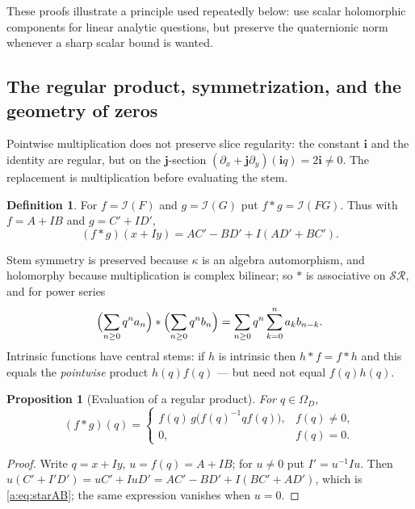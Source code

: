 \documentclass[11pt,a4paper]{article}
\numberwithin{equation}{section}
\newtheorem{proposition}[theorem]{Proposition}
\theoremstyle{definition}
\newtheorem{definition}[theorem]{Definition}
\theoremstyle{remark}
\theoremstyle{plain}
\newcommand{\I}{\mathcal I}
\newcommand{\SR}{\mathcal{SR}}
\newcommand{\Om}{\Omega}
\begin{document}
These proofs illustrate a principle used repeatedly below: use scalar
holomorphic components for linear analytic questions, but preserve the
quaternionic norm whenever a sharp scalar bound is wanted.

\subsection{The regular product, symmetrization, and the geometry of zeros}
\label{a:sec:algebra}

Pointwise multiplication does not preserve slice regularity: the constant
$\mathbf i$ and the identity are regular, but on the $\mathbf j$-section
$(\partial_x+\mathbf j\partial_y)(\mathbf iq)=2\mathbf i\ne0$. The replacement
is multiplication before evaluating the stem.

\begin{definition}
\label{a:def:star}
For $f=\I(F)$ and $g=\I(G)$ put $f*g=\I(FG)$. Thus with $f=A+IB$ and
$g=C'+ID'$,
\begin{equation}
 (f*g)(x+Iy)=AC'-BD'+I(AD'+BC').
 \label{a:eq:starAB}
\end{equation}
\end{definition}

Stem symmetry is preserved because $\kappa$ is an algebra automorphism, and
holomorphy because multiplication is complex bilinear; so $*$ is associative
on $\SR$, and for power series
\begin{equation}
 \Bigl(\sum_{n\ge0}q^na_n\Bigr)*\Bigl(\sum_{n\ge0}q^nb_n\Bigr)
 =\sum_{n\ge0}q^n\sum_{k=0}^na_kb_{n-k}.
 \label{a:eq:convolution}
\end{equation}
Intrinsic functions have central stems: if $h$ is intrinsic then $h*f=f*h$ and
this equals the \emph{pointwise} product $h(q)f(q)$ --- but need not equal
$f(q)h(q)$.

\begin{proposition}[Evaluation of a regular product]
\label{a:prop:evaluation}
For $q\in\Om_D$,
\begin{equation}
 (f*g)(q)=
 \begin{cases}
  f(q)\,g\bigl(f(q)^{-1}qf(q)\bigr),& f(q)\ne0,\\
  0,& f(q)=0.
 \end{cases}
 \label{a:eq:evaluation}
\end{equation}
\end{proposition}

\begin{proof}
Write $q=x+Iy$, $u=f(q)=A+IB$; for $u\ne0$ put $I'=u^{-1}Iu$. Then
$u(C'+I'D')=uC'+IuD'=AC'-BD'+I(BC'+AD')$, which is \eqref{a:eq:starAB}; the
same expression vanishes when $u=0$.
\end{proof}
\end{document}
